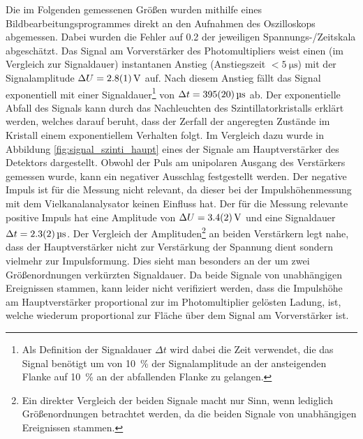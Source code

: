 \documentclass[11pt, a4paper]{article}
\numberwithin{equation}{section}
\begin{document}
Die im Folgenden gemessenen Größen wurden mithilfe eines Bildbearbeitungsprogrammes direkt an den Aufnahmen des Oszilloskops abgemessen.
Dabei wurden die Fehler auf \SI{0.2}{\division} der jeweiligen Spannungs-/Zeitskala abgeschätzt.
Das Signal am Vorverstärker des Photomultipliers weist einen (im Vergleich zur Signaldauer) instantanen Anstieg (Anstiegszeit $< \SI{5}{\micro\second}$) mit der Signalamplitude $\Delta U = \SI{2.8 +- 0.1}{\volt}$ auf.
Nach diesem Anstieg fällt das Signal exponentiell mit einer Signaldauer\footnote{Als Definition der Signaldauer $\Delta t$ wird dabei die Zeit verwendet, die das Signal benötigt um von \SI{10}{\percent} der Signalamplitude an der ansteigenden Flanke auf \SI{10}{\percent} an der abfallenden Flanke zu gelangen.} von $\Delta t = \SI{395 +- 20}{\micro\second}$ ab.
Der exponentielle Abfall des Signals kann durch das Nachleuchten des Szintillatorkristalls erklärt werden, welches darauf beruht, dass der Zerfall der angeregten Zustände im Kristall einem exponentiellem Verhalten folgt.
Im Vergleich dazu wurde in Abbildung \ref{fig:signal_szinti_haupt} eines der Signale am Hauptverstärker des Detektors dargestellt.
Obwohl der Puls am unipolaren Ausgang des Verstärkers gemessen wurde, kann ein negativer Ausschlag festgestellt werden.
Der negative Impuls ist für die Messung nicht relevant, da dieser bei der Impulshöhenmessung mit dem Vielkanalanalysator keinen Einfluss hat.
Der für die Messung relevante positive Impuls hat eine Amplitude von $\Delta U = \SI{3.4 +- 0.2}{\volt}$ und eine Signaldauer $\Delta t = \SI{2.3 +- 0.2}{\micro\second}$.
Der Vergleich der Amplituden\footnote{Ein direkter Vergleich der beiden Signale macht nur Sinn, wenn lediglich Größenordnungen betrachtet werden, da die beiden Signale von unabhängigen Ereignissen stammen.} an beiden Verstärkern legt nahe, dass der Hauptverstärker nicht zur Verstärkung der Spannung dient sondern vielmehr zur Impulsformung.
Dies sieht man besonders an der um zwei Größenordnungen verkürzten Signaldauer.
Da beide Signale von unabhängigen Ereignissen stammen, kann leider nicht verifiziert werden, dass die Impulshöhe am Hauptverstärker proportional zur im Photomultiplier gelösten Ladung, ist, welche wiederum proportional zur Fläche über dem Signal am Vorverstärker ist.
\end{document}
